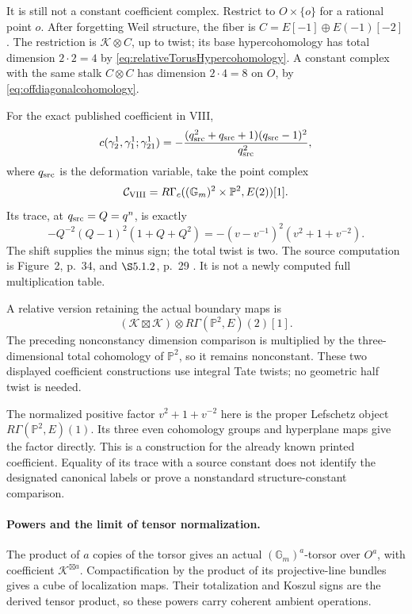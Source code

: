 It is still not a constant coefficient complex.
Restrict to \(O\times\{o\}\) for a rational point \(o\).
After forgetting Weil structure, the fiber is
\(C=E[-1]\oplus E(-1)[-2]\).
The restriction is \(\mathcal K\otimes C\), up to twist;
its base hypercohomology has total dimension \(2\cdot2=4\)
by \eqref{eq:relativeTorusHypercohomology}.
A constant complex with the same stalk \(C\otimes C\)
has dimension \(2\cdot4=8\) on \(O\), by
\eqref{eq:offdiagonalcohomology}.

For the exact published coefficient in VIII,
\[
 c(\gamma_2^1,\gamma_1^1;\gamma_{21}^1)
   =-\frac{(q_{\rm src}^2+q_{\rm src}+1)(q_{\rm src}-1)^2}
           {q_{\rm src}^2},
\]
where \(q_{\rm src}\) is the deformation variable,
take the point complex
\begin{equation}\label{eq:VIIIgeometriccoefficient}
 \mathcal C_{\rm VIII}
   =R\Gamma_c((\mathbb G_m)^2\times\mathbb P^2,E(2))[1].
\end{equation}
Its trace, at \(q_{\rm src}=Q=q^n\), is exactly
\[
 -Q^{-2}(Q-1)^2(1+Q+Q^2)
       =-(v-v^{-1})^2(v^2+1+v^{-2}).
\]
The shift supplies the minus sign; the total twist is two.
The source computation is Figure~2, p.~34, and
\(\S5.1.2\), p.~29 \cite{VIII}.
It is not a newly computed full multiplication table.

A relative version retaining the actual boundary maps is
\[
 (\mathcal K\boxtimes\mathcal K)\otimes
                   R\Gamma(\mathbb P^2,E)(2)[1].
\]
The preceding nonconstancy dimension comparison is multiplied
by the three-dimensional total cohomology of \(\mathbb P^2\),
so it remains nonconstant. These two displayed coefficient
constructions use integral Tate twists; no geometric half
twist is needed.

The normalized positive factor \(v^2+1+v^{-2}\) here is
the proper Lefschetz object
\(R\Gamma(\mathbb P^2,E)(1)\).
Its three even cohomology groups and hyperplane maps give
the factor directly. This is a construction for the already
known printed coefficient. Equality of its trace with a
source constant does not identify the designated canonical
labels or prove a nonstandard structure-constant comparison.

\paragraph{Powers and the limit of tensor normalization.}
The product of \(a\) copies of the torsor gives an actual
\((\mathbb G_m)^a\)-torsor over \(O^a\), with coefficient
\(\mathcal K^{\boxtimes a}\).
Compactification by the product of its projective-line
bundles gives a cube of localization maps. Their totalization
and Koszul signs are the derived tensor product, so these
powers carry coherent ambient operations.

